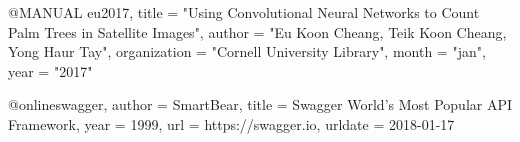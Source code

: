 @MANUAL {eu2017,
	title        = "Using Convolutional Neural Networks to Count Palm Trees in Satellite Images",
	author       = "Eu Koon Cheang, Teik Koon Cheang, Yong Haur Tay",
	organization = "Cornell University Library",
	month        = "jan",
	year         = "2017"
}

@online{swagger,
	author = {SmartBear},
	title = {{Swagger} World's Most Popular API Framework},
	year = 1999,
	url = {https://swagger.io},
	urldate = {2018-01-17}
}